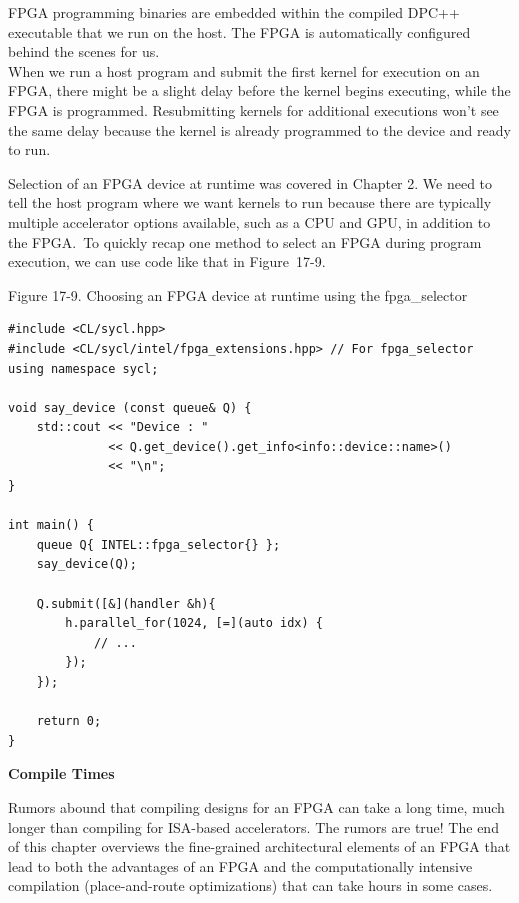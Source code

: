 \begin{tcolorbox}[colback=red!5!white,colframe=red!75!black]
FPGA programming binaries are embedded within the compiled DPC++ executable that we run on the host. The FPGA is automatically configured behind the scenes for us.\\
When we run a host program and submit the first kernel for execution on an FPGA, there might be a slight delay before the kernel begins executing, while the FPGA is programmed. Resubmitting kernels for additional executions won’t see the same delay because the kernel is already programmed to the device and ready to run.
\end{tcolorbox}

Selection of an FPGA device at runtime was covered in Chapter 2. We need to tell the host program where we want kernels to run because there are typically multiple accelerator options available, such as a CPU and GPU, in addition to the FPGA. To quickly recap one method to select an FPGA during program execution, we can use code like that in Figure 17-9.\par

\hspace*{\fill} \par %
Figure 17-9. Choosing an FPGA device at runtime using the fpga\_selector
\begin{lstlisting}[caption={}]
#include <CL/sycl.hpp>
#include <CL/sycl/intel/fpga_extensions.hpp> // For fpga_selector
using namespace sycl;

void say_device (const queue& Q) {
	std::cout << "Device : "
			  << Q.get_device().get_info<info::device::name>() 
			  << "\n";
}

int main() {
	queue Q{ INTEL::fpga_selector{} };
	say_device(Q);
	
	Q.submit([&](handler &h){
		h.parallel_for(1024, [=](auto idx) {
			// ...
		});
	});

	return 0;
}
\end{lstlisting}

\hspace*{\fill} \par %
\textbf{Compile Times}

Rumors abound that compiling designs for an FPGA can take a long time, much longer than compiling for ISA-based accelerators. The rumors are true! The end of this chapter overviews the fine-grained architectural elements of an FPGA that lead to both the advantages of an FPGA and the computationally intensive compilation (place-and-route optimizations) that can take hours in some cases.\par

